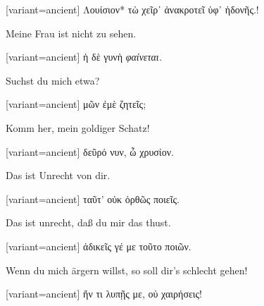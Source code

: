 \switchcolumn

\begin{greek}[variant=ancient]%
Λουίσιον{*} τὼ χεῖρ᾽ ἀνακροτεῖ ὑφ᾽ ἡδονῆς.!

\end{greek}%
\switchcolumn*

Meine Frau ist nicht zu sehen.

\switchcolumn

\begin{greek}[variant=ancient]%
ἡ δὲ γυνὴ \emph{φαίνεται.}

\end{greek}%
\switchcolumn*

Suchst du mich etwa?

\switchcolumn

\begin{greek}[variant=ancient]%
μῶν ἐμὲ ζητεῖς;

\end{greek}%
\switchcolumn*

Komm her, mein goldiger Schatz!

\switchcolumn

\begin{greek}[variant=ancient]%
δεῦρό νυν, ὦ χρυσίον.

\end{greek}%
Das ist Unrecht von dir.

\switchcolumn

\begin{greek}[variant=ancient]%
ταῦτ’ οὐκ ὀρθῶς ποιεῖς.

\end{greek}%
\switchcolumn*

Das ist unrecht, daß du mir das thust.

\switchcolumn

\begin{greek}[variant=ancient]%
ἀδικεῖς γέ με τοῦτο ποιῶν.

\end{greek}%
\switchcolumn*

Wenn du mich ärgern willst, so soll dir's schlecht gehen!

\switchcolumn

\begin{greek}[variant=ancient]%
ἤν τι λυπῇς με, οὐ χαιρήσεις!

\end{greek}%
\switchcolumn*

